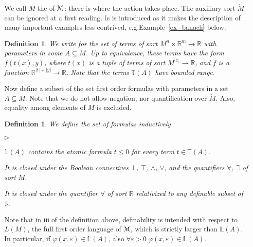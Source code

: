 \documentclass[12pt,letterpaper,oneside,reqno]{amsart}
\newcommand{\mylabel}[1]{{#1}\hfill}
\renewenvironment{itemize}
  {\begin{list}{$\triangleright$}{%
   \setlength{\parskip}{0mm}
   \setlength{\topsep}{.2\baselineskip}
   \setlength{\rightmargin}{0mm}
   \setlength{\listparindent}{0mm}
   \setlength{\itemindent}{0mm}
   \setlength{\labelwidth}{3ex}
   \setlength{\itemsep}{.2\baselineskip}
   \setlength{\parsep}{.2\baselineskip}
   \setlength{\partopsep}{0mm}
   \setlength{\labelsep}{1ex}
   \setlength{\leftmargin}{\labelwidth+\labelsep}
   \let\makelabel\mylabel}}{%
   \end{list}}
\theoremstyle{plain}
\newtheorem{definition}[theorem]{Definition}
\theoremstyle{remark}
\renewcommand*{\emph}[1]{%
   \smash{\tikz[baseline]\node[rectangle, fill=olive!25, rounded corners, inner xsep=0.5ex, inner ysep=0.2ex, anchor=base, minimum height = 2.7ex]{#1};}}
\begin{document}
We call $M$ the \emph{unit ball\/} of ${\EuScript M}$: there is where the action takes place.
The auxiliary sort ${\breve M}$ can be ignored at a first reading.
Is is introduced as it makes the description of many important examples less contrived, e.g.\@ Example~\ref{ex_banach} below.

\begin{definition}
  We write \emph{$\mathds{T}(A)$\/} for the set of terms of sort $ M^n\times\mathds{R}^m\to\mathds{R}$ with parameters in some $A\subseteq  M$.
  Up to equivalence, these terms have the form $f(t(x),y)$, where $t(x)$ is a tuple of terms of sort $M^{|x|}\to\mathds{R}$, and $f$ is a function $\mathds{R}^{|t|+|y|}\to\mathds{R}$.
  Note that the terms $\mathds{T}(A)$ have bounded range.
\end{definition}

Now define a subset of the set first order formulas with parameters in a set $A\subseteq M$.
Note that we do not allow negation, nor quantification over $\breve M$.
Also, equality among elements of $M$ is excluded.

\begin{definition}
  We define the set of formulas \emph{$\mathds{L}(A)$\/} inductively
  \begin{itemize}
  \item[i.] $\mathds{L}(A)$ contains the atomic formula $t\le0$ for every term $t\in\mathds{T}(A)$.
  \item[ii.] It is closed under the Boolean connectives $\bot$, $\top$, $\wedge$, $\vee$, and the quantifiers $\forall$, $\exists$ of sort $ M$.
  \item[iii.] It is closed under the quantifier $\forall$ of sort $\mathds{R}$ relativized to any definable subset of $\mathds{R}$.
  \end{itemize}
\end{definition}

Note that in iii of the definition above, definability is intended with respect to $L(M)$, the full first order language of ${\EuScript M}$, which is strictly larger than $\mathds{L}(A)$.
In particular, if $\varphi(x,\varepsilon)\in\mathds{L}(A)$, also $\forall\varepsilon{>}0\;\varphi(x,\varepsilon)\in\mathds{L}(A)$.
\end{document}
